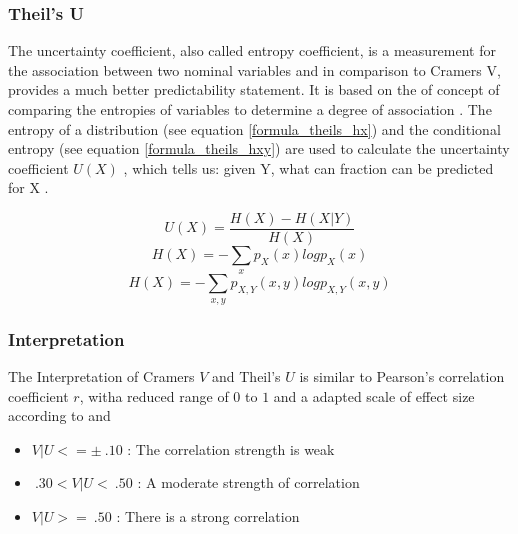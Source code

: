 \documentclass[a4paper,12pt]{report}
\begin{document}
\subsubsection{Theil’s U}
The uncertainty coefficient, also called entropy coefficient, is a measurement for the association between two nominal variables and in comparison to Cramers V, provides a much better predictability statement. It is based on the of concept of comparing the entropies of variables to determine a degree of association \cite{Hoang2019}. The entropy of a distribution (see equation \ref{formula_theils_hx}) and the conditional entropy (see equation \ref{formula_theils_hxy}) are used to calculate the uncertainty coefficient $U(X)$ \cite{Glen2017,Glen2018}, which tells us: given Y, what can fraction can be predicted for X \cite{Hoang2019}.

\smallskip
\begin{equation}
\label{formula_theils}
	U(X) = \frac{H(X)-H(X|Y)}{H(X)}
\end{equation}
\begin{equation}
\label{formula_theils_hx}
	H(X) = -\sum_{x} p_{X}(x)log p_X(x)
\end{equation}
\begin{equation}
\label{formula_theils_hxy}
	H(X) = -\sum_{x,y} p_{X,Y}(x,y)log p_{X,Y}(x,y)
\end{equation}


\subsubsection{Interpretation}
The Interpretation of Cramers $V$ and Theil's $U$ is similar to Pearson's correlation coefficient $r$, witha reduced range of $0$ to $1$ and a adapted scale of effect size according to \cite{Cohen1988} and \cite{Ellis2010}

\begin{itemize}
	\item $V|U <= \pm \: .10$ : The correlation strength is weak
	\item $\: .30 < V|U < \: .50$ : A moderate strength of correlation
	\item $V|U >= \: .50$ : There is a strong correlation
\end{itemize}
\end{document}
